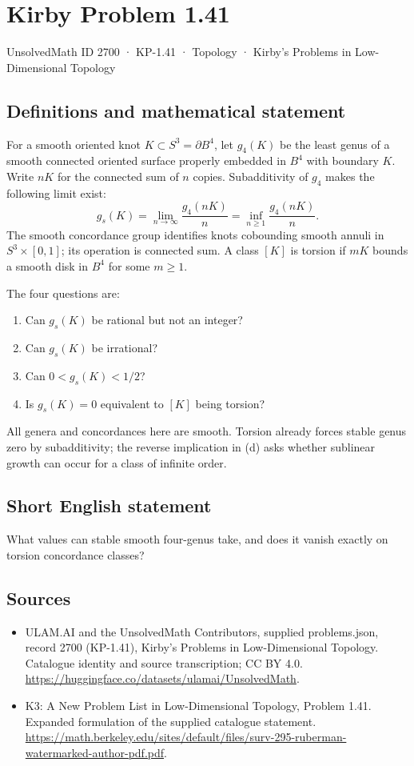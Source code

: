 \documentclass[11pt,a4paper]{article}
\begin{document}
\section*{Kirby Problem 1.41}\label{2700}
{\small UnsolvedMath ID 2700 · KP-1.41 · Topology · Kirby's Problems in Low-Dimensional Topology}
\subsection{Definitions and mathematical statement}
For a smooth oriented knot $K\subset S^3=\partial B^4$, let $g_4(K)$ be the least
genus of a smooth connected oriented surface properly embedded in $B^4$ with
boundary $K$. Write $nK$ for the connected sum of $n$ copies. Subadditivity of
$g_4$ makes the following limit exist:
\[
g_s(K)=\lim_{n\to\infty}\frac{g_4(nK)}n
=\inf_{n\geq1}\frac{g_4(nK)}n.
\]
The smooth concordance group identifies knots cobounding smooth annuli in
$S^3\times[0,1]$; its operation is connected sum. A class $[K]$ is torsion if
$mK$ bounds a smooth disk in $B^4$ for some $m\geq1$.

The four questions are:
\begin{enumerate}
\item Can $g_s(K)$ be rational but not an integer?
\item Can $g_s(K)$ be irrational?
\item Can $0<g_s(K)<1/2$?
\item Is $g_s(K)=0$ equivalent to $[K]$ being torsion?
\end{enumerate}
All genera and concordances here are smooth. Torsion already forces stable
genus zero by subadditivity; the reverse implication in (d) asks whether
sublinear growth can occur for a class of infinite order.
\subsection{Short English statement}
What values can stable smooth four-genus take, and does it vanish exactly on torsion concordance classes?
\subsection{Sources}
\begin{itemize}
\item[S1] ULAM.AI and the UnsolvedMath Contributors, supplied problems.json, record 2700 (KP-1.41), Kirby's Problems in Low-Dimensional Topology. Catalogue identity and source transcription; CC BY 4.0.
\url{https://huggingface.co/datasets/ulamai/UnsolvedMath}.
\item[S2] K3: A New Problem List in Low-Dimensional Topology, Problem 1.41. Expanded formulation of the supplied catalogue statement.
\url{https://math.berkeley.edu/sites/default/files/surv-295-ruberman-watermarked-author-pdf.pdf}.
\end{itemize}
\end{document}
